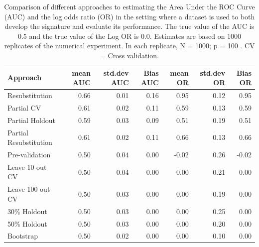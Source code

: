 \documentclass[11pt,]{article}
\begin{document}
\begin{table}

\caption{Comparison of different approaches to estimating the Area Under the ROC Curve (AUC) and the log odds ratio (OR) in the setting where a dataset is used to both develop the signature and evaluate its performance. The true value of the AUC is 0.5 and the true value of the Log OR is 0.0. Estimates are based on 1000 replicates of the numerical experiment. In each replicate,  N = 1000; p = 100 . CV = Cross validation. }
\centering
\begin{tabular}[t]{l|r|r|r|r|r|r}
\hline
Approach & mean AUC & std.dev AUC & Bias AUC & mean OR & std.dev OR & Bias OR\\
\hline
Resubstitution & 0.66 & 0.01 & 0.16 & 0.95 & 0.12 & 0.95\\
\hline
Partial CV & 0.61 & 0.02 & 0.11 & 0.59 & 0.13 & 0.59\\
\hline
Partial Holdout & 0.59 & 0.03 & 0.09 & 0.51 & 0.19 & 0.51\\
\hline
Partial Resubstitution & 0.61 & 0.02 & 0.11 & 0.66 & 0.13 & 0.66\\
\hline
Pre-validation & 0.50 & 0.04 & 0.00 & -0.02 & 0.26 & -0.02\\
\hline
Leave 10 out CV & 0.50 & 0.04 & 0.00 & 0.00 & 0.21 & 0.00\\
\hline
Leave 100 out CV & 0.50 & 0.03 & 0.00 & 0.00 & 0.19 & 0.00\\
\hline
30\% Holdout & 0.50 & 0.03 & 0.00 & 0.00 & 0.25 & 0.00\\
\hline
50\% Holdout & 0.50 & 0.03 & 0.00 & 0.00 & 0.20 & 0.00\\
\hline
Bootstrap & 0.50 & 0.02 & 0.00 & 0.00 & 0.10 & 0.00\\
\hline
\end{tabular}
\end{table}
\end{document}
